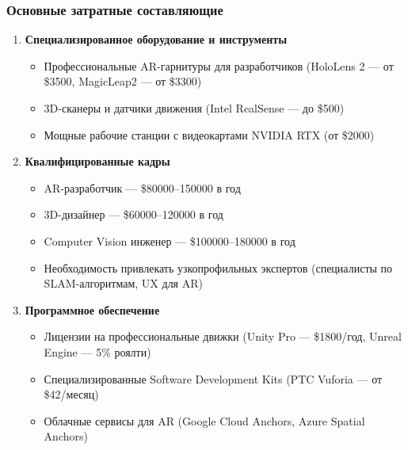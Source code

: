 \subsubsection{Основные затратные составляющие}
\begin{enumerate}
    \item \textbf{Специализированное оборудование и инструменты}
    \begin{itemize}
        \item Профессиональные AR-гарнитуры для разработчиков (HoloLens 2 --- от \$3500, MagicLeap2 --- от \$3300)
        \item 3D-сканеры и датчики движения (Intel RealSense --- до \$500)
        \item Мощные рабочие станции с видеокартами NVIDIA RTX (от \$2000)
    \end{itemize}
    
    \item \textbf{Квалифицированные кадры}
    \begin{itemize}
        \item AR-разработчик --- \$80000–150000 в год
        \item 3D-дизайнер --- \$60000–120000 в год
        \item Computer Vision инженер --- \$100000–180000 в год
        \item Необходимость привлекать узкопрофильных экспертов (специалисты по SLAM-алгоритмам, UX для AR)
    \end{itemize}
    
    \item \textbf{Программное обеспечение}
    \begin{itemize}
        \item Лицензии на профессиональные движки (Unity Pro --- \$1800/год, Unreal Engine --- 5\% роялти)
        \item Специализированные Software Development Kits (PTC Vuforia --- от \$42/месяц)
        \item Облачные сервисы для AR (Google Cloud Anchors, Azure Spatial Anchors)
    \end{itemize}
\end{enumerate}

